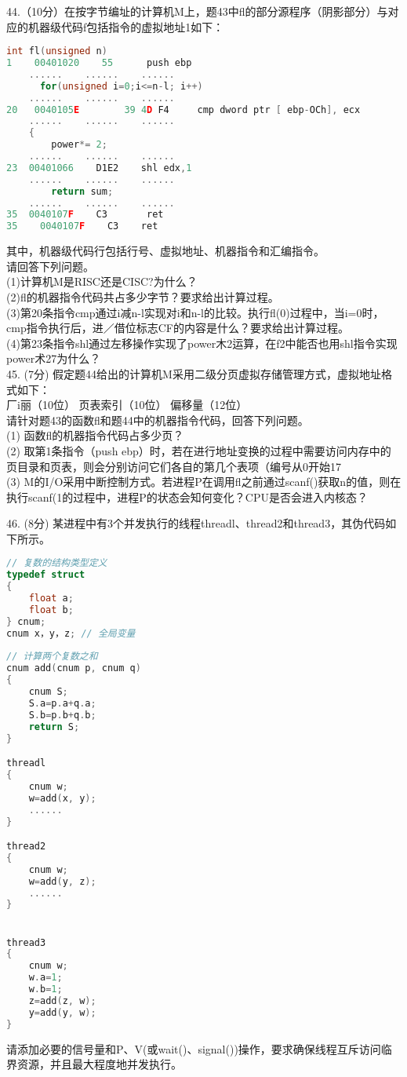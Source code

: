 44.（10分）在按字节编址的计算机M上，题43中fl的部分源程序（阴影部分）与对应的机器级代码f包括指令的虚拟地址1如下：
\begin{lstlisting}[language=cpp]
      int fl(unsigned n)
1    00401020    55      push ebp
    ......    ......    ......
      for(unsigned i=0;i<=n-l; i++)
    ......    ......    ......
20   0040105E        39 4D F4     cmp dword ptr [ ebp-OCh], ecx
    ......    ......    ......
    {
        power*= 2;
    ......    ......    ......
23  00401066    D1E2    shl edx,1
    ......    ......    ......
        return sum;
    ......    ......    ......
35  0040107F    C3       ret
35    0040107F    C3    ret
\end{lstlisting}
其中，机器级代码行包括行号、虚拟地址、机器指令和汇编指令。 \\
请回答下列问题。 \\
(1)计算机M是RISC还是CISC?为什么？ \\
(2)fl的机器指令代码共占多少字节？要求给出计算过程。 \\
(3)第20条指令cmp通过i减n-l实现对i和n-l的比较。执行fl(0)过程中，当i=0时，cmp指令执行后，进／借位标志CF的内容是什么？要求给出计算过程。 \\
(4)第23条指令shl通过左移操作实现了power木2运算，在f2中能否也用shl指令实现power术27为什么？ \\

45. (7分) 假定题44给出的计算机M采用二级分页虚拟存储管理方式，虚拟地址格式如下： \\
厂i丽（10位）    页表索引（10位）    偏移量（12位） \\
请针对题43的函数fl和题44中的机器指令代码，回答下列问题。 \\
(1) 函数fl的机器指令代码占多少页？ \\
(2) 取第1条指令（push ebp）时，若在进行地址变换的过程中需要访问内存中的页目录和页表，则会分别访问它们各自的第几个表项（编号从0开始17 \\
(3) M的I/O采用中断控制方式。若进程P在调用fl之前通过scanf()获取n的值，则在执行scanf(1的过程中，进程P的状态会知何变化？CPU是否会进入内核态？

46. (8分) 某进程中有3个并发执行的线程threadl、thread2和thread3，其伪代码如下所示。 \\
\begin{lstlisting}[language=cpp]
// 复数的结构类型定义
typedef struct       
{
    float a;
    float b;
} cnum;         
cnum x，y，z; // 全局变量
                          
// 计算两个复数之和     
cnum add(cnum p, cnum q)
{                         
    cnum S;  
    S.a=p.a+q.a;
    S.b=p.b+q.b;      
    return S;
}

threadl
{             
    cnum w;
    w=add(x, y);
    ......
}

thread2
{
    cnum w;
    w=add(y, z);
    ......
}


thread3
{
    cnum w;
    w.a=1;
    w.b=1;
    z=add(z, w);
    y=add(y, w);
}
\end{lstlisting}
请添加必要的信号量和P、V(或wait()、signal())操作，要求确保线程互斥访问临界资源，并且最大程度地并发执行。

